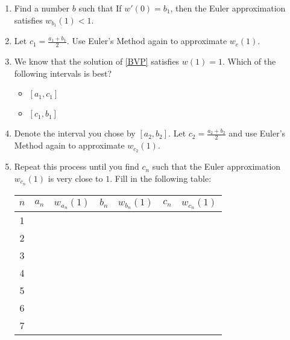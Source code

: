 \begin{enumerate}
\begin{enumerate}
		\item Find a number $b$ such that If $w'(0)=b_1$, then the Euler approximation satisfies $w_{b_1}(1)<1$.

		\item Let $c_1 = \frac{a_1+b_1}{2}$. Use Euler's Method again to approximate $w_c(1)$.
		
		\item We know that the solution of \eqref{BVP} satisfies $w(1)=1$. Which of the following intervals is best?
		\begin{itemize}
			\item $[a_1,c_1]$
			\item $[c_1,b_1]$
		\end{itemize}
		
		\item Denote the interval you chose by $[a_2,b_2]$. Let $c_2 = \frac{a_2+b_2}{2}$ and use Euler's Method again to approximate $w_{c_2}(1)$.

		\item Repeat this process until you find $c_n$ such that the Euler approximation $w_{c_n}(1)$ is very close to $1$. Fill in the following table:
		
		\begin{tabular}{|c||c|c||c|c||c|c|}
			\hline
			$n$ & \hspace{20pt} $a_n$ \hspace{20pt} &  \hspace{10pt} $w_{a_n}(1)$  \hspace{10pt} & $b_n$  \hspace{20pt} &  \hspace{10pt} $w_{b_n}(1)$ \hspace{10pt} &  \hspace{20pt} $c_n$  \hspace{20pt} & \hspace{10pt} $w_{c_n}(1)$ \hspace{10pt} \\ \hline
			 1 & & & & & & \\[10pt]\hline
  			 2 & & & & & & \\[10pt]\hline
			 3 & & & & & & \\[10pt]\hline
  			 4 & & & & & & \\[10pt]\hline
			 5 & & & & & & \\[10pt]\hline
  			 6 & & & & & & \\[10pt]\hline
  			 7 & & & & & & \\[10pt]\hline
		\end{tabular}
		

\end{enumerate}
\end{enumerate}
